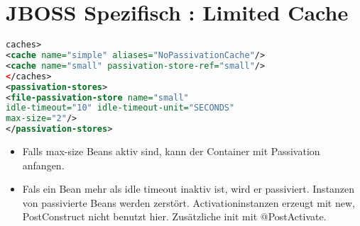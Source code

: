 \documentclass[a4paper,10pt]{scrreprt}
\begin{document}
\section{JBOSS Spezifisch : Limited Cache}
\begin{lstlisting}[caption=Limited Cache,language=xml]
 caches>
<cache name="simple" aliases="NoPassivationCache"/>
<cache name="small" passivation-store-ref="small"/>
</caches>
<passivation-stores>
<file-passivation-store name="small"
idle-timeout="10" idle-timeout-unit="SECONDS"
max-size="2"/>
</passivation-stores>
\end{lstlisting}
\begin{itemize}
 \item Falls max-size Beans aktiv sind, kann der Container mit  Passivation anfangen.
 \item Fals ein Bean mehr als idle timeout inaktiv ist, wird er passiviert.
 \subitem Instanzen von passivierte Beans werden zerstört.
  \subitem Activationinstanzen erzeugt mit new, PostConstruct nicht benutzt hier.
  \subitem Zusätzliche init mit @PostActivate.
\end{itemize}
\end{document}
